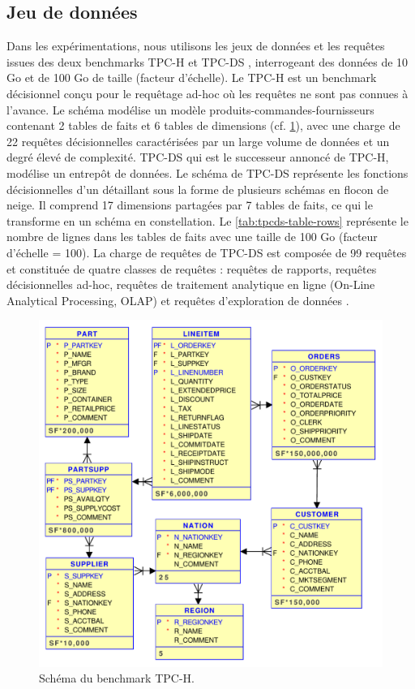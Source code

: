 \subsection{Jeu de données}
Dans les expérimentations, nous utilisons les jeux de données et les requêtes issues des deux benchmarks TPC-H et TPC-DS \cite{TPCH, TPCDS}, interrogeant des données de 10 Go et de 100 Go de taille (facteur d'échelle). Le TPC-H est un benchmark décisionnel conçu pour le requêtage ad-hoc où les requêtes ne sont pas connues à l'avance. Le schéma modélise un modèle produits-commandes-fournisseurs contenant 2 tables de faits et 6 tables de dimensions (cf. \ref{fig:tpch-schema}), avec une charge de 22 requêtes décisionnelles caractérisées par un large volume de données et un degré élevé de complexité.
TPC-DS qui est le successeur annoncé de TPC-H, modélise un entrepôt de données. Le schéma de TPC-DS représente les fonctions décisionnelles d'un détaillant sous la forme de plusieurs schémas en flocon de neige. Il comprend 17 dimensions partagées par 7 tables de faits, ce qui le transforme en un schéma en constellation. Le \ref{tab:tpcds-table-rows} représente le nombre de lignes dans les tables de faits avec une taille de 100 Go (facteur d'échelle = 100). La charge de requêtes de TPC-DS est composée de 99 requêtes et  constituée de quatre classes de requêtes : requêtes de rapports, requêtes décisionnelles ad-hoc, requêtes de traitement analytique en ligne (On-Line Analytical Processing, OLAP) et requêtes d'exploration de données \cite{Nambiar06}.
\begin{figure}
 \centering
 \includegraphics[scale=0.6]{chapitre4/chap4Fig/tpch-schema.pdf}
 \caption{Schéma du benchmark TPC-H.}
 \label{fig:tpch-schema}
\end{figure}

